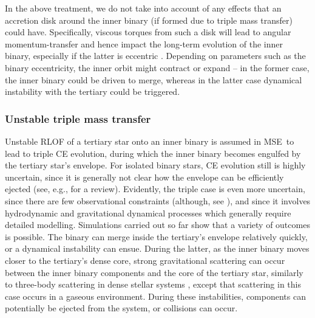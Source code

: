 \documentclass[twocolumn,appendixfloats,tighten]{aastex631}
\newcommand{\mse}{\textsc{MSE}}
\begin{document}
In the above treatment, we do not take into account of any effects that an accretion disk around the inner binary (if formed due to triple mass transfer) could have. Specifically, viscous torques from such a disk will lead to angular momentum-transfer and hence impact the long-term evolution of the inner binary, especially if the latter is eccentric \citep[e.g.,][]{2017MNRAS.466.1170M,2019ApJ...871...84M,2020ApJ...889..114M}. Depending on parameters such as the binary eccentricity, the inner orbit might contract or expand -- in the former case, the inner binary could be driven to merge, whereas in the latter case dynamical instability with the tertiary could be triggered. 



\subsubsection{Unstable triple mass transfer}
\label{sect:meth:tr:unstab}
Unstable RLOF of a tertiary star onto an inner binary is assumed in \mse~to lead to triple CE evolution, during which the inner binary becomes engulfed by the tertiary star's envelope. For isolated binary stars, CE evolution still is highly uncertain, since it is generally not clear how the envelope can be efficiently ejected (see, e.g., \citealt{2013A&ARv..21...59I} for a review). Evidently, the triple case is even more uncertain, since there are few observational constraints (although, see \citealt{2019MNRAS.484.4711M}), and since it involves hydrodynamic and gravitational dynamical processes which generally require detailed modelling. Simulations carried out so far \citep[e.g.,][]{2020MNRAS.498.2957C,2021MNRAS.500.1921G} show that a variety of outcomes is possible. The binary can merge  inside the tertiary's envelope relatively quickly, or a dynamical instability can ensue. During the latter, as the inner binary moves closer to the tertiary's dense core, strong gravitational scattering can occur between the inner binary components and the core of the tertiary star, similarly to three-body scattering in dense stellar systems \citep[e.g.,][]{1983ApJ...268..319H}, except that scattering in this case occurs in a gaseous environment. During these instabilities, components can potentially be ejected from the system, or collisions can occur. 
\end{document}
